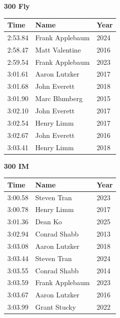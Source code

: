 \vspace{1.2em}
\noindent\begin{minipage}[t]{0.48\textwidth}
\centering
\textbf{\textcolor{teamprimary}{300 Fly}}\par
\vspace{0.5em}
\centering
\small
\renewcommand{\arraystretch}{1.0}
\setlength{\tabcolsep}{4pt}
\begin{tabular}{@{}p{1.8cm}p{3.0cm}p{1.0cm}@{}}
\toprule
\textbf{Time} & \textbf{Name} & \textbf{Year} \\
\midrule
2:53.84 & Frank Applebaum & 2024 \\
2:58.47 & Matt Valentine & 2016 \\
2:59.54 & Frank Applebaum & 2023 \\
3:01.61 & Aaron Lutzker & 2017 \\
3:01.68 & John Everett & 2018 \\
3:01.90 & Marc Blumberg & 2015 \\
3:02.10 & John Everett & 2017 \\
3:02.54 & Henry Limm & 2017 \\
3:02.67 & John Everett & 2016 \\
3:03.41 & Henry Limm & 2018 \\
\bottomrule
\end{tabular}
\end{minipage}
\hfill
\begin{minipage}[t]{0.48\textwidth}
\centering
\textbf{\textcolor{teamprimary}{300 IM}}\par
\vspace{0.5em}
\centering
\small
\renewcommand{\arraystretch}{1.0}
\setlength{\tabcolsep}{4pt}
\begin{tabular}{@{}p{1.8cm}p{3.0cm}p{1.0cm}@{}}
\toprule
\textbf{Time} & \textbf{Name} & \textbf{Year} \\
\midrule
3:00.58 & Steven Tran & 2023 \\
3:00.78 & Henry Limm & 2017 \\
3:01.36 & Dean Ko & 2025 \\
3:02.94 & Conrad Shabb & 2013 \\
3:03.08 & Aaron Lutzker & 2018 \\
3:03.44 & Steven Tran & 2024 \\
3:03.55 & Conrad Shabb & 2014 \\
3:03.59 & Frank Applebaum & 2023 \\
3:03.67 & Aaron Lutzker & 2016 \\
3:03.99 & Grant Stucky & 2022 \\
\bottomrule
\end{tabular}
\end{minipage}
